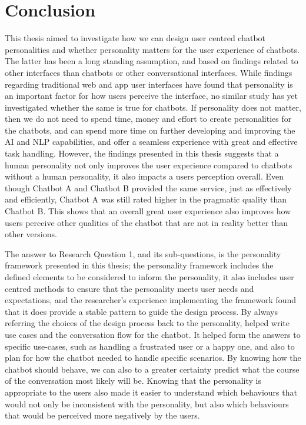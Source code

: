 \chapter{Conclusion}
\label{chap:conclusion}

This thesis aimed to investigate how we can design user centred chatbot personalities and whether personality matters for the user experience of chatbots. The latter has been a long standing assumption, and based on findings related to other interfaces than chatbots or other conversational interfaces. While findings regarding traditional web and app user interfaces have found that personality is an important factor for how users perceive the interface, no similar study has yet investigated whether the same is true for chatbots. If personality does not matter, then we do not need to spend time, money and effort to create personalities for the chatbots, and can spend more time on further developing and improving the AI and NLP capabilities, and offer a seamless experience with great and effective task handling. However, the findings presented in this thesis suggests that a human personality not only improves the user experience compared to chatbots without a human personality, it also impacts a users perception overall. Even though Chatbot A and Chatbot B provided the same service, just as effectively and efficiently, Chatbot A was still rated higher in the pragmatic quality than Chatbot B. This shows that an overall great user experience also improves how users perceive other qualities of the chatbot that are not in reality better than other versions.

The answer to Research Question 1, and its sub-questions, is the personality framework presented in this thesis; the personality framework includes the defined elements to be considered to inform the personality, it also includes user centred methods to ensure that the personality meets user needs and expectations, and the researcher's experience implementing the framework found that it does provide a stable pattern to guide the design process. By always referring the choices of the design process back to the personality, helped write use cases and the conversation flow for the chatbot. It helped form the answers to specific use-cases, such as handling a frustrated user or a happy one, and also to plan for how the chatbot needed to handle specific scenarios. By knowing how the chatbot should behave, we can also to a greater certainty predict what the course of the conversation most likely will be. Knowing that the personality is appropriate to the users also made it easier to understand which behaviours that would not only be inconsistent with the personality, but also which behaviours that would be perceived more negatively by the users.

